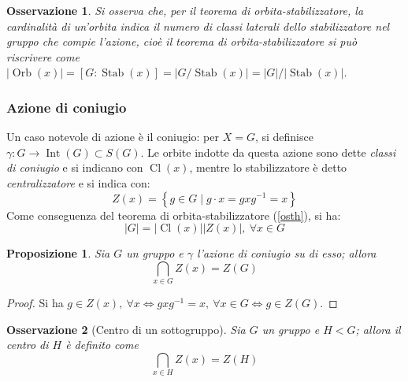 \documentclass[12pt]{scrartcl}
\theoremstyle{style}
\newtheorem{prop}{Proposizione}[section]
\newtheorem{osservazione}{Osservazione}[section]
\numberwithin{equation}{subsection}
\begin{document}
\begin{osservazione}
Si osserva che, per il teorema di orbita-stabilizzatore, la cardinalit\`a di un'orbita indica il numero di classi laterali dello stabilizzatore nel gruppo che compie l'azione, cio\`e il teorema di orbita-stabilizzatore si pu\`o riscrivere come $\lvert \operatorname{Orb} (x) \rvert = [G: \operatorname{Stab} (x)] = \lvert G / \operatorname{Stab} (x) \rvert = \lvert G \rvert / \lvert \operatorname{Stab} (x) \rvert $.
\end{osservazione}


\subsubsection{Azione di coniugio}
 Un caso notevole di azione \`e il coniugio: per $X=G$, si definisce $\gamma : G \to \operatorname{Int} (G) \subset S(G)$.
Le orbite indotte da questa azione sono dette \textit{classi di coniugio} e si indicano con $\operatorname{Cl} (x)$, mentre lo stabilizzatore \`e detto \textit{centralizzatore} e si indica con:
\begin{equation}
	Z(x) = \left\{ g \in G  \mid g \cdot x = gxg^{-1} = x \right\} 
\end{equation}
Come conseguenza del teorema di orbita-stabilizzatore (\ref{osth}), si ha:
\begin{equation}
	\lvert G \rvert  = \lvert \operatorname{Cl} (x)  \rvert  \lvert Z(x) \rvert , \ \forall x \in G
\end{equation}
\begin{prop}
	Sia $G$ un gruppo e $\gamma$ l'azione di coniugio su di esso; allora
	\[
	\bigcap_{x \in G} Z(x) = Z(G)
	\] 
\end{prop}
	\begin{proof}
		Si ha $g \in Z(x), \ \forall x \iff gxg^{-1} =x , \ \forall x \in G \iff g \in Z(G)$.
	\end{proof}
\begin{osservazione}
	[Centro di un sottogruppo]
	Sia $G$ un gruppo e $H < G$; allora il centro di $H$ \`e definito come 
	\[
	\bigcap_{x \in H}  Z(x) = Z(H)
	\] 
\end{osservazione}
\end{document}
